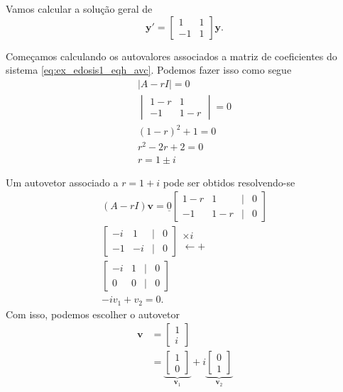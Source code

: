 \begin{ex}
  Vamos calcular a solução geral de
  \begin{equation}\label{eq:ex_edosis1_eqh_avc}
    \pmb{y}' =
    \begin{bmatrix}
      1 & 1 \\
      -1 & 1
    \end{bmatrix}\pmb{y}.
  \end{equation}

  Começamos calculando os autovalores associados a matriz de coeficientes do sistema \eqref{eq:ex_edosis1_eqh_avc}. Podemos fazer isso como segue
  \begin{gather}
    |A-rI| = 0 \\
    \begin{vmatrix}
      1-r & 1 \\
      -1 & 1-r
    \end{vmatrix} = 0 \\
    (1-r)^2 + 1 = 0 \\
    r^2 - 2r + 2 = 0 \\
    r = 1\pm i
  \end{gather}

  Um autovetor associado a $r = 1 + i$ pode ser obtidos resolvendo-se
  \begin{gather}
    (A-rI)\pmb{v} = \underline{0}
    \begin{bmatrix}
      1-r & 1 & | & 0 \\
      -1 & 1-r & | & 0
    \end{bmatrix} \\
    \begin{bmatrix}
      -i &  1 & | & 0 \\
      -1 & -i & | & 0
    \end{bmatrix}
    \begin{matrix}
      \times i \\
      \leftarrow +
    \end{matrix}\\
    \begin{bmatrix}
      -i & 1 & | & 0 \\
      0 & 0 & | & 0
    \end{bmatrix} \\
    -iv_1 + v_2 = 0.
  \end{gather}
  Com isso, podemos escolher o autovetor
  \begin{align}
    \pmb{v} &=
    \begin{bmatrix}
      1 \\
      i
    \end{bmatrix} \\
    &=
    \underbrace{\begin{bmatrix}
        1\\
        0
    \end{bmatrix}}_{\pmb{v}_1} + i
    \underbrace{\begin{bmatrix}
        0\\
        1
    \end{bmatrix}}_{\pmb{v}_2}
  \end{align}
  

\end{ex}
